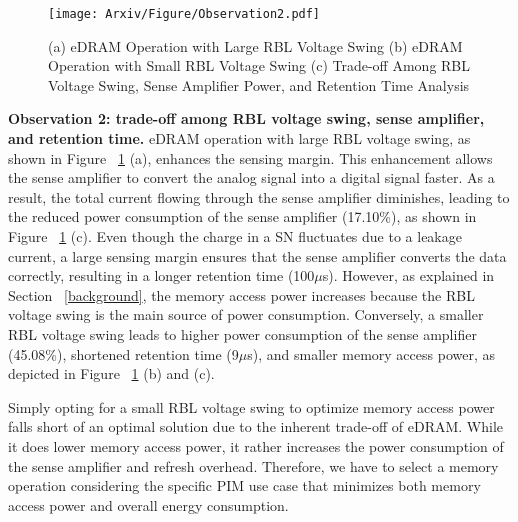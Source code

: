 \begin{figure}[t]
\centering
\texttt{[image: Arxiv/Figure/Observation2.pdf]}
\caption{(a) eDRAM Operation with Large RBL Voltage Swing (b) eDRAM Operation with Small RBL Voltage Swing (c) Trade-off Among RBL Voltage Swing, Sense Amplifier Power, and Retention Time Analysis}
\vspace{-0.1in}
\label{figure3-2}
\end{figure}

\textbf{Observation 2: trade-off among RBL voltage swing, sense amplifier, and retention time.} eDRAM operation with large RBL voltage swing, as shown in Figure ~\ref{figure3-2} (a), enhances the sensing margin. This enhancement allows the sense amplifier to convert the analog signal into a digital signal faster. As a result, the total current flowing through the sense amplifier diminishes, leading to the reduced power consumption of the sense amplifier  (17.10\%), as shown in Figure ~\ref{figure3-2} (c). Even though the charge in a SN fluctuates due to a leakage current, a large sensing margin ensures that the sense amplifier converts the data correctly, resulting in a longer retention time (100$\mu$s). However, as explained in Section ~\ref{background}, the memory access power increases because the RBL voltage swing is the main source of power consumption. Conversely, a smaller RBL voltage swing leads to higher power consumption of the sense amplifier (45.08\%), shortened retention time (9$\mu$s), and smaller memory access power, as depicted in Figure ~\ref{figure3-2} (b) and (c).

Simply opting for a small RBL voltage swing to optimize memory access power falls short of an optimal solution due to the inherent trade-off of eDRAM. While it does lower memory access power, it rather increases the power consumption of the sense amplifier and refresh overhead. Therefore, we have to select a memory operation considering the specific PIM use case that minimizes both memory access power and overall energy consumption.
